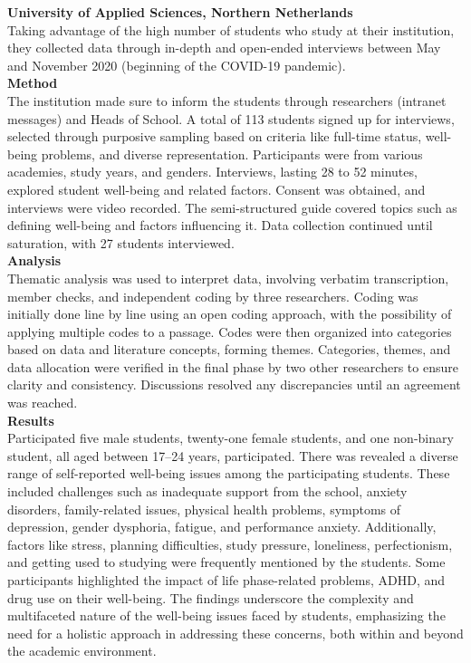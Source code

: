 \documentclass[11pt]{report}
\begin{document}
\textbf{University of Applied Sciences, Northern Netherlands \cite{research-1}}
\\ \normalsize Taking advantage of the high number of students who study at their institution, they collected data through in-depth and open-ended interviews between May and November 2020 (beginning of the COVID-19 pandemic).\vspace{5mm} \\
\textbf{Method} \\
The institution made sure to inform the students through researchers (intranet messages) and Heads of School. A total of 113 students signed up for interviews, selected through purposive sampling based on criteria like full-time status, well-being problems, and diverse representation. Participants were from various academies, study years, and genders. Interviews, lasting 28 to 52 minutes, explored student well-being and related factors. Consent was obtained, and interviews were video recorded. The semi-structured guide covered topics such as defining well-being and factors influencing it. Data collection continued until saturation, with 27 students interviewed.\vspace{5mm} \\
\textbf{Analysis} \\
Thematic analysis was used to interpret data, involving verbatim transcription, member checks, and independent coding by three researchers. Coding was initially done line by line using an open coding approach, with the possibility of applying multiple codes to a passage. Codes were then organized into categories based on data and literature concepts, forming themes. Categories, themes, and data allocation were verified in the final phase by two other researchers to ensure clarity and consistency. Discussions resolved any discrepancies until an agreement was reached.\vspace{5mm} \\
\newpage
\noindent \textbf{Results} \\
Participated five male students, twenty-one female students, and one non-binary student, all aged between 17–24 years, participated. There was revealed a diverse range of self-reported well-being issues among the participating students. These included challenges such as inadequate support from the school, anxiety disorders, family-related issues, physical health problems, symptoms of depression, gender dysphoria, fatigue, and performance anxiety. Additionally, factors like stress, planning difficulties, study pressure, loneliness, perfectionism, and getting used to studying were frequently mentioned by the students. Some participants highlighted the impact of life phase-related problems, ADHD, and drug use on their well-being. The findings underscore the complexity and multifaceted nature of the well-being issues faced by students, emphasizing the need for a holistic approach in addressing these concerns, both within and beyond the academic environment.\vspace{5mm} \\
\end{document}
